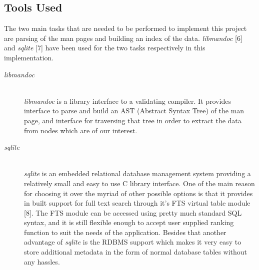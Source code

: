 \documentclass[titlepage, a4paper, 12pt]{article}
\begin{document}
\subsection{Tools Used}
The two main tasks that are needed to be performed to implement this project are
parsing of the man pages
and building an index of the data. \textit{libmandoc} [6]
and \textit{sqlite} [7] have been used for the two tasks respectively in this
implementation.
\begin{description}
\item[\textit{libmandoc}] \hfill \\
\textit{libmandoc} is a library interface to a validating compiler. It provides
interface to parse and build an AST (Abstract Syntax Tree) of the man page, 
and interface for traversing that tree in order to extract the data from nodes
which are of our interest.
\end{description}
\begin{description}
\item[\textit{sqlite}] \hfill \\
\textit{sqlite} is an embedded relational database management system providing a
relatively small and easy to use C library interface. One of the main reason
for choosing it over the myriad of other possible options is that it provides
in built support for full text search through it's FTS virtual table module [8].
The FTS module can be accessed using pretty much standard SQL syntax, and it is
still flexible enough to accept user supplied ranking function to suit the needs
of the application. Besides that another advantage of \textit{sqlite} is the
RDBMS support which makes it very easy to store additional metadata in the form
of normal database tables without any hassles.
\end{description}
\end{document}
